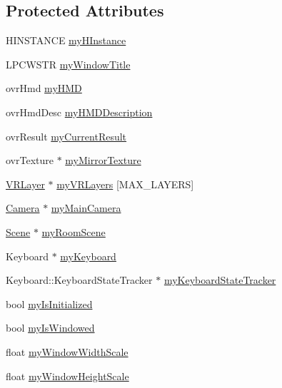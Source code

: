 \subsection*{Protected Attributes}
\begin{DoxyCompactItemize}
\item 
H\+I\+N\+S\+T\+A\+N\+CE \hyperlink{class_basic_v_r_a5742130f7f3380da8e15a5f18b2b9f9b}{my\+H\+Instance}
\item 
L\+P\+C\+W\+S\+TR \hyperlink{class_basic_v_r_a3d17ef45cc13b39c7bd7e0106e6701db}{my\+Window\+Title}
\item 
ovr\+Hmd \hyperlink{class_basic_v_r_a23836eafb746bb2b92231beff9a9d76f}{my\+H\+MD}
\item 
ovr\+Hmd\+Desc \hyperlink{class_basic_v_r_aac00280b306310fd91944252dc422920}{my\+H\+M\+D\+Description}
\item 
ovr\+Result \hyperlink{class_basic_v_r_abf70fd52f6d3d9b3e471ce6b901b1a98}{my\+Current\+Result}
\item 
ovr\+Texture $\ast$ \hyperlink{class_basic_v_r_a07cc999ed9b14415166f909d0668b541}{my\+Mirror\+Texture}
\item 
\hyperlink{class_v_r_layer}{V\+R\+Layer} $\ast$ \hyperlink{class_basic_v_r_a2833a6f257610c214ed056c15a7f7785}{my\+V\+R\+Layers} \mbox{[}M\+A\+X\+\_\+\+L\+A\+Y\+E\+RS\mbox{]}
\item 
\hyperlink{class_camera}{Camera} $\ast$ \hyperlink{class_basic_v_r_a6c5320ef1fd4a951275da8d061bf71f8}{my\+Main\+Camera}
\item 
\hyperlink{class_scene}{Scene} $\ast$ \hyperlink{class_basic_v_r_a22a227877993e0f8cb1a1c8ed87070da}{my\+Room\+Scene}
\item 
Keyboard $\ast$ \hyperlink{class_basic_v_r_a2f9da8e8ccf48ce62e67a5e9e7f1be39}{my\+Keyboard}
\item 
Keyboard\+::\+Keyboard\+State\+Tracker $\ast$ \hyperlink{class_basic_v_r_acb6048b16b951dad8ba260453b455696}{my\+Keyboard\+State\+Tracker}
\item 
bool \hyperlink{class_basic_v_r_ac473465e66957471452478235fecfbe8}{my\+Is\+Initialized}
\item 
bool \hyperlink{class_basic_v_r_af0f6d4d8948900bac113d0eb3e3766ac}{my\+Is\+Windowed}
\item 
float \hyperlink{class_basic_v_r_ac6a774a1d2c2a6e49b70920a77363c83}{my\+Window\+Width\+Scale}
\item 
float \hyperlink{class_basic_v_r_a920b493bbb4217990d0c36dda41fa606}{my\+Window\+Height\+Scale}
\item 

\end{DoxyCompactItemize}
